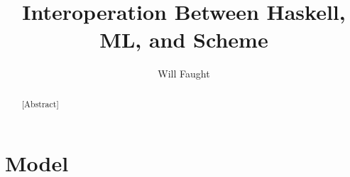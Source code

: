 \documentclass[12pt]{ucthesis}
\begin{document}
\title{Interoperation Between Haskell, ML, and Scheme}
\author{Will Faught}
\maketitle

\begin{frontmatter}

\copyrightpage
\approvalpage
\begin{abstract}
[Abstract]
\end{abstract}
\begin{acknowledgements}
[Acknowledgements]
\end{acknowledgements}
\tableofcontents
\listoftables
\listoffigures

\end{frontmatter}

\pagestyle{plain}
\renewcommand{\baselinestretch}{1.66}


\chapter{Model}









\clearpage


\end{document}
